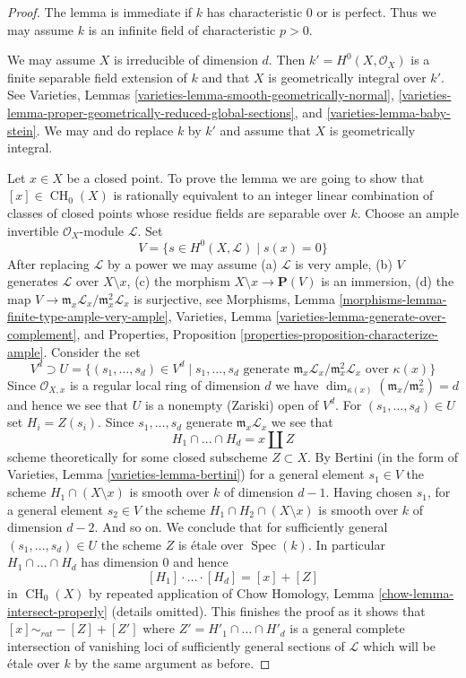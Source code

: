 \documentclass[10pt,a4paper]{amsart}
\theoremstyle{plain}
\theoremstyle{definition}
\theoremstyle{remark}
\numberwithin{equation}{subsection}
\def\Spec{\mathop{\mathrm{Spec}}}
\def\CH{\mathop{\mathrm{CH}}\nolimits}
\begin{document}
\begin{proof}
The lemma is immediate if $k$ has characteristic $0$ or is perfect.
Thus we may assume $k$ is an infinite field of characteristic $p > 0$.

\medskip\noindent
We may assume $X$ is irreducible of dimension $d$.
Then $k' = H^0(X, \mathcal{O}_X)$ is a finite separable field
extension of $k$ and that $X$ is geometrically integral over $k'$.
See Varieties, Lemmas \ref{varieties-lemma-smooth-geometrically-normal},
\ref{varieties-lemma-proper-geometrically-reduced-global-sections}, and
\ref{varieties-lemma-baby-stein}. We may and do replace $k$ by $k'$
and assume that $X$ is geometrically integral.

\medskip\noindent
Let $x \in X$ be a closed point. To prove the lemma we are going to show that
$[x] \in \CH_0(X)$ is rationally equivalent to an integer linear
combination of classes of closed points whose residue fields
are separable over $k$. Choose an ample invertible
$\mathcal{O}_X$-module $\mathcal{L}$. Set
$$
V = \{s \in H^0(X, \mathcal{L}) \mid s(x) = 0 \}
$$
After replacing $\mathcal{L}$ by a power we may assume
(a) $\mathcal{L}$ is very ample, (b) $V$ generates
$\mathcal{L}$ over $X \setminus x$, (c) the morphism
$X \setminus x \to \mathbf{P}(V)$ is an immersion, (d)
the map $V \to \mathfrak m_x\mathcal{L}_x/\mathfrak m_x^2\mathcal{L}_x$
is surjective, see
Morphisms, Lemma \ref{morphisms-lemma-finite-type-ample-very-ample},
Varieties, Lemma \ref{varieties-lemma-generate-over-complement}, and
Properties, Proposition \ref{properties-proposition-characterize-ample}.
Consider the set
$$
V^d \supset U =
\{
(s_1, \ldots, s_d) \in V^d \mid s_1, \ldots, s_d
\text{ generate }
\mathfrak m_x\mathcal{L}_x/\mathfrak m_x^2\mathcal{L}_x
\text{ over }\kappa(x)
\}
$$
Since $\mathcal{O}_{X, x}$ is a regular local ring of dimension $d$
we have $\dim_{\kappa(x)}(\mathfrak m_x/\mathfrak m_x^2) = d$
and hence we see that $U$ is a nonempty (Zariski) open of $V^d$.
For $(s_1, \ldots, s_d) \in U$ set $H_i = Z(s_i)$. Since
$s_1, \ldots, s_d$ generate $\mathfrak m_x\mathcal{L}_x$
we see that
$$
H_1 \cap \ldots \cap H_d = x \amalg Z
$$
scheme theoretically for some closed subscheme $Z \subset X$.
By Bertini (in the form of Varieties, Lemma \ref{varieties-lemma-bertini})
for a general element $s_1 \in V$ the scheme $H_1 \cap (X \setminus x)$
is smooth over $k$ of dimension $d - 1$.
Having chosen $s_1$, for a general element
$s_2 \in V$ the scheme $H_1 \cap H_2 \cap (X \setminus x)$
is smooth over $k$ of dimension $d - 2$. And so on.
We conclude that for sufficiently general
$(s_1, \ldots, s_d) \in U$ the scheme $Z$ is \'etale over $\Spec(k)$.
In particular $H_1 \cap \ldots \cap H_d$ has dimension $0$
and hence
$$
[H_1] \cdot \ldots \cdot [H_d] = [x] + [Z]
$$
in $\CH_0(X)$ by repeated application of
Chow Homology, Lemma \ref{chow-lemma-intersect-properly} (details omitted).
This finishes the proof as it shows that $[x] \sim_{rat} - [Z] + [Z']$
where $Z' = H'_1 \cap \ldots \cap H'_d$ is a general complete
intersection of vanishing loci of sufficiently general sections
of $\mathcal{L}$ which will be \'etale over $k$ by the same argument
as before.
\end{proof}
\end{document}
